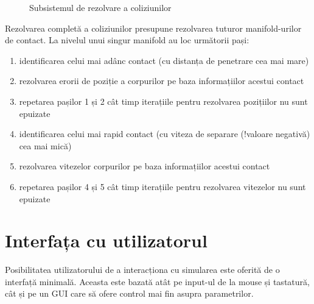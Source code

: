 \documentclass[12pt,a4paper]{report}
\begin{document}
\begin{figure}[H]
	\centering
	\caption[]{Subsistemul de rezolvare a coliziunilor}
	\label{fig:CollisionResolutionSmall}
\end{figure}

Rezolvarea completă a coliziunilor presupune rezolvarea tuturor manifold-urilor de contact. La nivelul unui singur manifold au loc următorii pași:
\begin{enumerate}
	\item identificarea celui mai adânc contact (cu distanța de penetrare cea mai mare)
	\item rezolvarea erorii de poziție a corpurilor pe baza informațiilor acestui contact
	\item repetarea pașilor 1 și 2 cât timp iterațiile pentru rezolvarea pozițiilor nu sunt epuizate
	\item identificarea celui mai rapid contact (cu viteza de separare (!valoare negativă) cea mai mică)
	\item rezolvarea vitezelor corpurilor pe baza informațiilor acestui contact
	\item repetarea pașilor 4 și 5 cât timp iterațiile pentru rezolvarea vitezelor nu sunt epuizate
\end{enumerate}

\section{Interfața cu utilizatorul}
Posibilitatea utilizatorului de a interacționa cu simularea este oferită de o interfață minimală. Aceasta este bazată atât pe input-ul de la mouse și tastatură, cât și pe un GUI care să ofere control mai fin asupra parametrilor.
\end{document}
